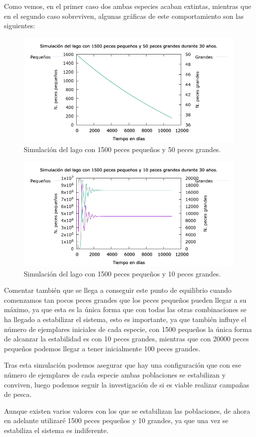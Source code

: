 \documentclass[12pt, spanish]{article}
\begin{document}
Como vemos, en el primer caso dos ambas especies acaban extintas, mientras que en el segundo caso sobreviven, algunas gráficas de este comportamiento son las siguientes:


\begin{figure}[H]
	\centering
	\includegraphics[scale = 0.6]{lago_10950_1500_50.png}
	\caption{Simulación del lago con 1500 peces pequeños y 50 peces grandes.}
	\label{fig:ej4}
\end{figure}

\begin{figure}[H]
	\centering
	\includegraphics[scale = 0.6]{lago_10950_1500_10.png}
	\caption{Simulación del lago con 1500 peces pequeños y 10 peces grandes.}
	\label{fig:ej4}
\end{figure}

Comentar también que se llega a conseguir este punto de equilibrio cuando comenzamos tan pocos peces grandes que los peces pequeños pueden llegar a su máximo, ya que esta es la única forma que con todas las otras combinaciones se ha llegado a estabilizar el sistema, esto es importante, ya que también influye el número de ejemplares iniciales de cada especie, con 1500 pequeños la única forma de alcanzar la estabilidad es con 10 peces grandes, mientras que con 20000 peces pequeños podemos llegar a tener inicialmente 100 peces grandes.


Tras esta simulación podemos asegurar que hay una configuración que con ese número de ejemplares de cada especie ambas poblaciones se estabilizan y conviven, luego podemos seguir la investigación de si es viable realizar campañas de pesca.

Aunque existen varios valores con los que se estabilizan las poblaciones, de ahora en adelante utilizaré 1500 peces pequeños y 10 grandes, ya que una vez se estabiliza el sistema es indiferente.

%
%
\end{document}
